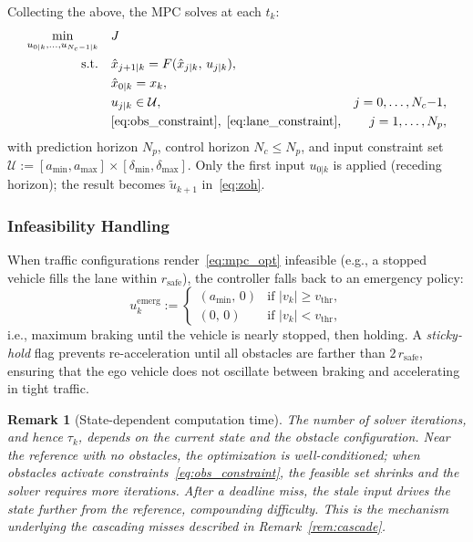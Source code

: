 \documentclass[conference]{IEEEtran}
\newcommand{\calU}{\mathcal{U}}
\newtheorem{remark}{Remark}
\begin{document}
Collecting the above, the MPC solves at each $t_k$:
\begin{subequations}\label{eq:mpc_opt}
\begin{align}
  \min_{u_{0|k},\ldots,u_{N_c-1|k}} \quad & J
    \label{eq:mpc_obj}\\
  \text{s.t.} \quad
    & \hat{x}_{j+1|k} = F(\hat{x}_{j|k},\, u_{j|k}),
    \label{eq:mpc_dyn}\\
    & \hat{x}_{0|k} = x_k,
    \label{eq:mpc_ic}\\
    & u_{j|k} \in \calU, & j = 0,\ldots,N_c{-}1,
    \label{eq:mpc_input}\\
    & \eqref{eq:obs_constraint},\;\eqref{eq:lane_constraint},
    & j = 1,\ldots,N_p,
    \label{eq:mpc_safety}
\end{align}
\end{subequations}
with prediction horizon $N_p$, control horizon $N_c \le N_p$,
and input constraint set
$\calU := [a_{\min},a_{\max}]\times[\delta_{\min},\delta_{\max}]$.
Only the first input $u_{0|k}$ is applied (receding horizon);
the result becomes $\tilde{u}_{k+1}$ in~\eqref{eq:zoh}.

\subsubsection{Infeasibility Handling}\label{sec:infeasible}

When traffic configurations render~\eqref{eq:mpc_opt}
infeasible (e.g., a stopped vehicle fills the lane within
$r_{\mathrm{safe}}$), the controller falls back to an emergency
policy:
\begin{equation}\label{eq:emergency}
  u_k^{\mathrm{emerg}} :=
  \begin{cases}
    (a_{\min},\, 0) & \text{if } |v_k| \ge v_{\mathrm{thr}}, \\
    (0,\, 0)        & \text{if } |v_k| < v_{\mathrm{thr}},
  \end{cases}
\end{equation}
i.e., maximum braking until the vehicle is nearly stopped, then
holding.  A \emph{sticky-hold} flag prevents re-acceleration
until all obstacles are farther than $2\,r_{\mathrm{safe}}$,
ensuring that the ego vehicle does not oscillate between braking
and accelerating in tight traffic.

\begin{remark}[State-dependent computation time]\label{rem:mpc_tau}
  The number of solver iterations, and hence $\tau_k$, depends
  on the current state and the obstacle configuration.  Near the
  reference with no obstacles, the optimization is
  well-conditioned; when obstacles activate
  constraints~\eqref{eq:obs_constraint}, the feasible set
  shrinks and the solver requires more iterations.  After a
  deadline miss, the stale input drives the state further from
  the reference, compounding difficulty.  This is the mechanism
  underlying the cascading misses described in
  Remark~\ref{rem:cascade}.
\end{remark}
\end{document}
